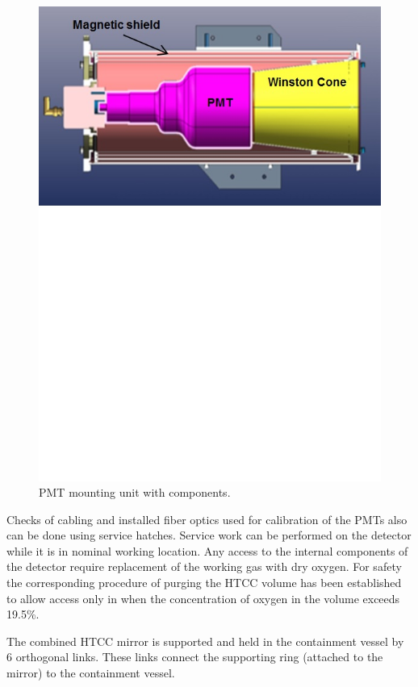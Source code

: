 \begin{figure}[ht]
    \centering
    \includegraphics[width=1.0\linewidth,trim={0 12cm 0 0},clip]{images/PMT_Mount.jpg}
    \caption{PMT mounting unit with components.}
    \label{fig:PMT_Mount}
\end{figure}

Checks of cabling and installed fiber optics used for calibration of the PMTs also can be done using service hatches. Service work can be performed on the detector while it is in nominal working location. Any access to the internal components of the detector require replacement of the working gas with dry oxygen. For safety the corresponding procedure of purging the HTCC volume has been established to allow access only in when the concentration of oxygen in the volume exceeds 19.5\%.

The combined HTCC mirror is supported and held in the containment vessel by 6 orthogonal links. These links connect the supporting ring (attached to the mirror) to the containment vessel.

